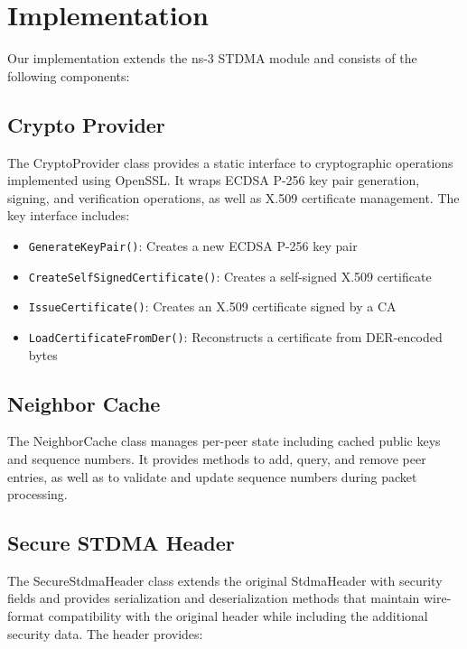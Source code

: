 \documentclass[conference]{IEEEtran}
\begin{document}
\section{Implementation}
\label{sec:implementation}

Our implementation extends the ns-3 STDMA module and consists of the following components:

\subsection{Crypto Provider}

The CryptoProvider class provides a static interface to cryptographic operations implemented using OpenSSL. It wraps ECDSA P-256 key pair generation, signing, and verification operations, as well as X.509 certificate management. The key interface includes:

\begin{itemize}
    \item \texttt{GenerateKeyPair()}: Creates a new ECDSA P-256 key pair
    \item \texttt{CreateSelfSignedCertificate()}: Creates a self-signed X.509 certificate
    \item \texttt{IssueCertificate()}: Creates an X.509 certificate signed by a CA
    \item \texttt{LoadCertificateFromDer()}: Reconstructs a certificate from DER-encoded bytes
\end{itemize}

\subsection{Neighbor Cache}

The NeighborCache class manages per-peer state including cached public keys and sequence numbers. It provides methods to add, query, and remove peer entries, as well as to validate and update sequence numbers during packet processing.

\subsection{Secure STDMA Header}

The SecureStdmaHeader class extends the original StdmaHeader with security fields and provides serialization and deserialization methods that maintain wire-format compatibility with the original header while including the additional security data. The header provides:
\end{document}
